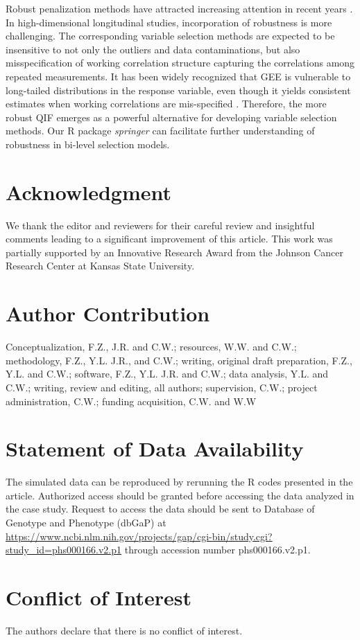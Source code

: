 \documentclass[12pt]{article}
\begin{document}
Robust penalization methods have attracted increasing attention in recent years \cite{freue2019robust,hu2021meta,sun2022robust,chen2022lq}. In high-dimensional longitudinal studies, incorporation of robustness is more challenging. The corresponding variable selection methods are expected to be insensitive to not only the outliers and data contaminations, but also misspecification of working correlation structure capturing the correlations among repeated measurements. It has been widely recognized that GEE is vulnerable to long-tailed distributions in the response variable, even though it yields consistent estimates when working correlations are mis-specified \cite{qu2004assessing}. Therefore, the more robust QIF emerges as a powerful alternative for developing variable selection methods. Our R package \emph{springer} can facilitate further understanding of robustness in bi-level selection models. 



\section{Acknowledgment}
We thank the editor and reviewers for their careful review and insightful comments leading to a significant improvement of this article. This work was partially supported by an Innovative Research Award from the Johnson Cancer Research Center at Kansas State University.

\section{Author Contribution}
Conceptualization, F.Z., J.R. and C.W.; resources, W.W. and C.W.; methodology, F.Z., Y.L. J.R., and C.W.; writing, original draft preparation, F.Z., Y.L. and C.W.; software, F.Z., Y.L. J.R. and C.W.; data analysis, Y.L. and C.W.; writing, review and editing, all authors; supervision, C.W.; project administration, C.W.; funding acquisition, C.W. and W.W


\section{Statement of Data Availability}

The simulated data can be reproduced by rerunning the R codes presented in the article. Authorized access should be granted before accessing the data analyzed in the case study. Request to access the data should be sent to Database of Genotype and Phenotype (dbGaP) at \url{https://www.ncbi.nlm.nih.gov/projects/gap/cgi-bin/study.cgi?study_id=phs000166.v2.p1} through accession number phs000166.v2.p1. 




\section{Conflict of Interest}
The authors declare that there is no conflict of interest.






\end{document}
